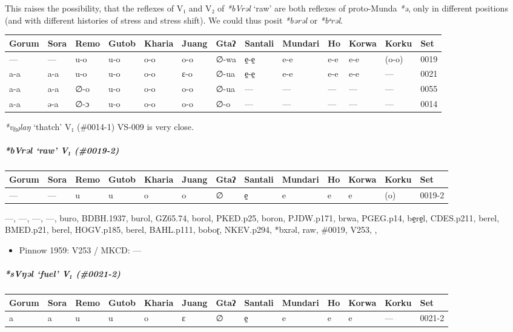 \documentclass[a4paper,]{article}
\providecommand{\tightlist}{%
  \setlength{\itemsep}{0pt}\setlength{\parskip}{0pt}}
\let\oldsubparagraph\subparagraph
\renewcommand{\subparagraph}[1]{\oldsubparagraph{#1}\mbox{}}
\begin{document}
This raises the possibility, that the reflexes of V₁ and V₂ of
\emph{*bVrəl} `raw' are both reflexes of proto-Munda \emph{*ə}, only in
different positions (and with different histories of stress and stress
shift). We could thus posit \emph{*bərəl} or \emph{*bᵊrəl}.

\begin{longtable}[]{@{}lllllllllllll@{}}
\toprule
Gorum & Sora & Remo & Gutob & Kharia & Juang & Gtaʔ & Santali & Mundari
& Ho & Korwa & Korku & Set\tabularnewline
\midrule
\endhead
--- & --- & u-o & u-o & o-o & o-o & ∅-wa & e̠-e̠ & e-e & e-e & e-e & (o-o)
& 0019\tabularnewline
a-a & a-a & u-o & u-o & o-o & ɛ-o & ∅-ua & e̠-e̠ & e-e & e-e & e-e & --- &
0021\tabularnewline
a-a & a-a & ∅-o & u-o & o-o & o-o & ∅-ua & --- & --- & --- & --- & --- &
0055\tabularnewline
a-a & ə-a & ∅-ɔ & u-o & o-o & o-o & ∅-o & --- & --- & --- & --- & --- &
0014\tabularnewline
\bottomrule
\end{longtable}

\emph{*v₍₉₎laŋ} `thatch' V₁ (\#0014-1) VS-009 is very close.

\subparagraph{\texorpdfstring{\emph{*bVrəl} `raw' V₁
(\#0019-2)}{*bVrəl raw V₁ (\#0019-2)}}\label{bvrux259l-raw-v-0019-2}

\begin{longtable}[]{@{}lllllllllllll@{}}
\toprule
Gorum & Sora & Remo & Gutob & Kharia & Juang & Gtaʔ & Santali & Mundari
& Ho & Korwa & Korku & Set\tabularnewline
\midrule
\endhead
--- & --- & u & u & o & o & ∅ & e̠ & e & e & e & (o) &
0019-2\tabularnewline
\bottomrule
\end{longtable}

---, ---, ---, ---, buro, BDBH.1937, burol, GZ65.74, borol, PKED.p25,
boron, PJDW.p171, brwa, PGEG.p14, be̠re̠l, CDES.p211, berel, BMED.p21,
berel, HOGV.p185, berel, BAHL.p111, boboɽ, NKEV.p294, *bxrəl, raw,
\#0019, V253, ,

\begin{itemize}
\tightlist
\item
  Pinnow 1959: V253 / MKCD: ---
\end{itemize}

\subparagraph{\texorpdfstring{\emph{*sVŋəl} `fuel' V₁
(\#0021-2)}{*sVŋəl fuel V₁ (\#0021-2)}}\label{svux14bux259l-fuel-v-0021-2}

\begin{longtable}[]{@{}lllllllllllll@{}}
\toprule
Gorum & Sora & Remo & Gutob & Kharia & Juang & Gtaʔ & Santali & Mundari
& Ho & Korwa & Korku & Set\tabularnewline
\midrule
\endhead
a & a & u & u & o & ɛ & ∅ & e̠ & e & e & e & --- & 0021-2\tabularnewline
\bottomrule
\end{longtable}
\end{document}
